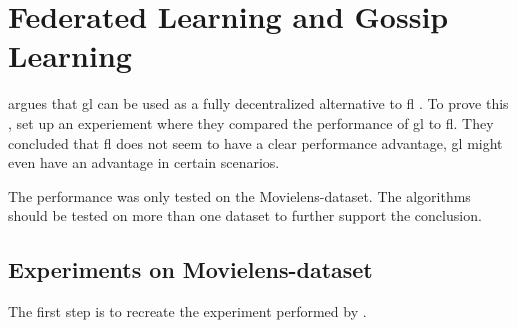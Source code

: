 \chapter{Federated Learning and Gossip Learning}
\label{chap:discussion}

\citeauthor{glrecsys} argues that \acrshort{gl} can be used as a fully decentralized alternative to \acrshort{fl} \cite{glrecsys}. To prove this \citeauthor{glrecsys}, set up an experiement where they compared the performance of \acrshort{gl} to \acrshort{fl}. They concluded that \acrshort{fl} does not seem to have a clear performance advantage, \acrshort{gl} might even have an advantage in certain scenarios.

The performance was only tested on the  Movielens-dataset. The algorithms should be tested on more than one dataset to further support the conclusion.

\section{Experiments on Movielens-dataset}

The first step is to recreate the experiment performed by \citeauthor{glrecsys}.